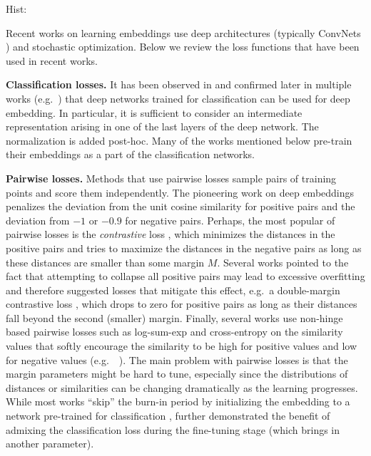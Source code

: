 

Hist:

Recent works on learning embeddings use deep architectures (typically ConvNets \citep{LeCun89,Krizhevsky12}) and stochastic optimization. Below we review the loss functions that have been used in recent works.%

{\bf Classification losses.} It has been observed in \citep{Krizhevsky12} and confirmed later in multiple works (e.g.\ \citep{Razavian14}) that deep networks trained for classification can be used for deep embedding. In particular, it is sufficient to consider an intermediate representation arising in one of the last layers of the deep network. The normalization is added post-hoc. Many of the works mentioned below pre-train their embeddings as a part of the classification networks.

{\bf Pairwise losses.} Methods that use pairwise losses sample pairs of training points and score them independently. The pioneering work on deep embeddings \citep{Bromley93} penalizes the deviation from the unit cosine similarity for positive pairs and the deviation from $-1$ or $-0.9$ for negative pairs.
Perhaps, the most popular of pairwise losses is the \textit{contrastive} loss \citep{Chopra05,Simo15}, which minimizes the distances in the positive pairs and tries to maximize the distances in the negative pairs as long as these distances are smaller than some margin $M$. Several works pointed to the fact  that attempting to collapse all positive pairs may lead to excessive overfitting and therefore suggested losses that mitigate this effect, e.g.\ a double-margin contrastive loss \citep{Lin15}, which drops to zero for positive pairs as long as their distances fall beyond the second (smaller) margin. Finally, several works use non-hinge based pairwise losses such as log-sum-exp and cross-entropy on the similarity values that softly encourage the similarity to be high for positive values and low for negative values (e.g.\ \  \citep{Yi14,Taigman14}). The main problem with pairwise losses is that the margin parameters might be hard to tune, especially since the distributions of distances or similarities can be changing dramatically as the learning progresses. While most works ``skip'' the burn-in period by initializing the embedding to a network pre-trained for classification \citep{Taigman14}, \citep{Sun14} further demonstrated the benefit of admixing the classification loss during the fine-tuning stage (which brings in another parameter).

